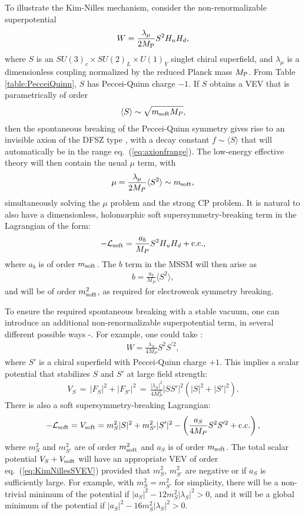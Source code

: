 \documentclass[12pt]{article}
\def\beq{\begin{eqnarray}}
\def\eeq{\end{eqnarray}}
\def\MPlanck{M_{\rm P}}
\begin{document}
To illustrate the Kim-Nilles mechanism, consider 
the non-renormalizable superpotential
\beq
W = \frac{\lambda_\mu}{2\MPlanck} S^2 H_u H_d,
\eeq
where $S$ is an $SU(3)_c \times SU(2)_L \times U(1)_Y$ singlet chiral
superfield, and
$\lambda_\mu$
is a dimensionless coupling normalized by the reduced Planck mass $\MPlanck$. From Table 
\ref{table:PecceiQuinn}, $S$ has Peccei-Quinn charge $-1$.
If $S$ obtains a VEV that is parametrically of order
\beq
\langle S \rangle \sim
\sqrt{m_{\rm soft} M_P},
\label{eq:KimNillesSVEV}
\eeq
then the spontaneous breaking of the
Peccei-Quinn symmetry gives rise to an invisible 
axion of the DFSZ type \cite{DFSZ}, with a decay constant
$f \sim \langle S \rangle$ that will 
automatically be in the range eq.~(\ref{eq:axionfrange}).
The low-energy effective theory will then contain the usual $\mu$ term, with
\beq
\mu = \frac{\lambda_\mu}{2 M_P} \langle S^2 \rangle  \sim m_{\rm soft},
\eeq
simultaneously solving 
the $\mu$ problem and the strong
CP problem. It is natural to also
have a dimensionless, holomorphic soft supersymmetry-breaking term in the
Lagrangian of the form:
\beq
-{\cal L}_{\rm soft} = \frac{a_b}{M_P} S^2 H_u H_d + {\rm c.c.},
\eeq
where $a_b$ is of order $m_{\rm soft}$.
The $b$ term in the MSSM will then arise as \beq
b = \frac{a_b}{M_P} \langle S^2
\rangle,
\eeq
and will be of order $m_{\rm soft}^2$, as required for
electroweak symmetry breaking.

To ensure the required spontaneous breaking with a stable vacuum, 
one can introduce an additional
non-renormalizable superpotential term, in several different possible ways
\cite{MurayamaSuzukiYanagida}-\cite{Martinaxinos}.
For example, one could take \cite{Martinaxinos}:
\beq
W = \frac{\lambda_S}{4 M_{P}} S^2 S^{\prime 2},
\eeq
where $S'$ is a chiral superfield with Peccei-Quinn charge $+1$.
This implies a scalar potential that stabilizes $S$ and $S'$ at
large field strength:
\beq
V_S \,=\, |F_S|^2 + |F_{S'}|^2 \,=\, \frac{|\lambda_S|^2}{4 M_P^2}
|S S'|^2 (|S|^2 + |S'|^2) .
\eeq
There is also a soft supersymmetry-breaking Lagrangian:
\beq
-{\cal L}_{\rm soft} = V_{\rm soft} = m^2_S |S|^2  + m^2_{S'}
|S'|^2 - \left ( \frac{a_S}{4 M_P} S^2 S^{\prime 2}  + {\rm c.c.} \right ),
\eeq
where $m^2_S$ and $m^2_{S'}$ are of order $m_{\rm soft}^2$
and $a_S$ is of order $m_{\rm soft}$. The total scalar potential
$V_S + V_{\rm soft}$
will have
an appropriate VEV of order eq.~(\ref{eq:KimNillesSVEV}) provided that
$m^2_S$, $m^2_{S'}$ are
negative or if $a_S$ is sufficiently large. For example, with $m^2_S =
m^2_{S'}$ for simplicity, there will be a non-trivial minimum of
the potential if $|a_S|^2 - 12 m_S^2 |\lambda_S|^2 > 0$,
and it will be a global minimum of the potential if $|a_S|^2 - 16 m_S^2
|\lambda_S|^2 > 0$.
\end{document}
